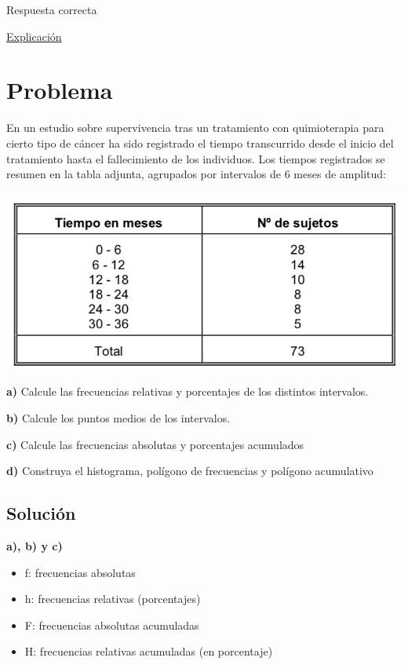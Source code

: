 \documentclass[
]{book}
\providecommand{\tightlist}{%
  \setlength{\itemsep}{0pt}\setlength{\parskip}{0pt}}
\begin{document}
Respuesta correcta

\href{https://1fjmanzano.github.io/bioestadistica/me\%CC\%81todos-de-muestreo.html}{Explicación}

\hypertarget{problema-4}{%
\section{Problema}\label{problema-4}}

En un estudio sobre supervivencia tras un tratamiento con quimioterapia para cierto tipo de cáncer ha sido registrado el tiempo transcurrido desde el inicio del tratamiento hasta el fallecimiento de los individuos. Los tiempos registrados se resumen en la tabla adjunta, agrupados por intervalos de 6 meses de amplitud:

\includegraphics[width=10.44in]{img/1_1}

\textbf{a)} Calcule las frecuencias relativas y porcentajes de los distintos intervalos.

\textbf{b)} Calcule los puntos medios de los intervalos.

\textbf{c)} Calcule las frecuencias absolutas y porcentajes acumulados

\textbf{d)} Construya el histograma, polígono de frecuencias y polígono acumulativo

\hypertarget{soluciuxf3n-4}{%
\subsection{Solución}\label{soluciuxf3n-4}}

\textbf{a), b) y c)}

\begin{itemize}
\tightlist
\item
  f: frecuencias absolutas
\item
  h: frecuencias relativas (porcentajes)
\item
  F: frecuencias absolutas acumuladas
\item
  H: frecuencias relativas acumuladas (en porcentaje)
\end{itemize}
\end{document}
